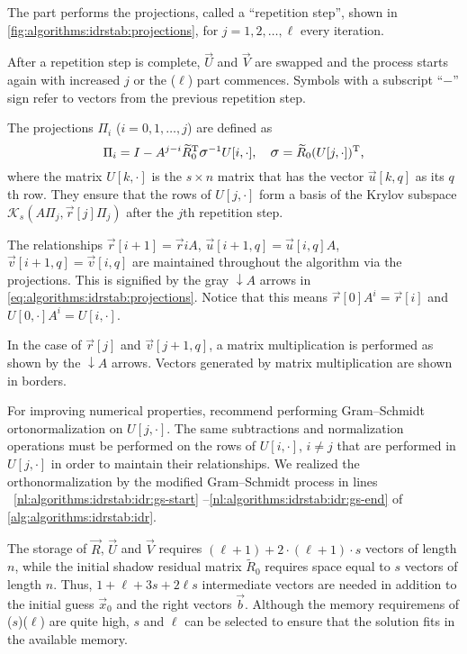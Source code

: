 The  part performs the projections, called a ``repetition
step'', shown in \cref{fig:algorithms:idrstab:projections}, for
$j = 1, 2, \ldots, \ell$ every iteration.

After a repetition step is complete, $\vec{U}$ and $\vec{V}$ are
swapped and the process starts again with increased $j$ or the
($\ell$) part commences. Symbols with a subscript
``$-$'' sign refer to vectors from the previous repetition step.

The projections $\Pi_i$ ($i = 0, 1, \ldots, j$) are defined as
\begin{equation}
  \label{eq:algorithms:idrstab:projection}
  \Pi_i = I - A^{j - i} \widetilde{R}_0^\T \largesigma^{-1} U[i, \cdot],
  \quad \largesigma = \widetilde{R}_0 (U[j, \cdot])^\T \text,
\end{equation}
where the matrix $U[k, \cdot]$ is the $s \times n$ matrix that has the
vector $\vec{u}[k, q]$ as its $q$th row. They ensure that the rows of
$U[j, \cdot]$ form a basis of the Krylov subspace
$\mathcal{K}_s(A \Pi_j, \vec{r}[j] \Pi_j)$ after the $j$th repetition
step.

The relationships $\vec{r}[i + 1] = \vec{r}{i} A$,
$\vec{u}[i + 1, q] = \vec{u}[i, q] A$,
$\vec{v}[i + 1, q] = \vec{v}[i, q]$ are maintained throughout the
algorithm via the projections. This is signified by the gray
{\color{black!50}$\downarrow A$} arrows in
\cref{eq:algorithms:idrstab:projections}. Notice that this means
$\vec{r}[0] A^i = \vec{r}[i]$ and $U[0, \cdot] A^i = U[i, \cdot]$.

In the case of $\vec{r}[j]$ and $\vec{v}[j + 1, q]$, a matrix
multiplication is performed as shown by the $\downarrow A$
arrows. Vectors generated by matrix multiplication are shown in
borders.

For improving numerical properties, \citet{sleijpen2010exploiting}
recommend performing Gram--Schmidt ortonormalization on $U[j, \cdot]$.
The same subtractions and normalization operations must be performed
on the rows of $U[i, \cdot]$, $i \ne j$ that are performed in
$U[j, \cdot]$ in order to maintain their relationships. We realized
the orthonormalization by the modified Gram--Schmidt process in lines%
~\ref{nl:algorithms:idrstab:idr:gs-start}%
--\ref{nl:algorithms:idrstab:idr:gs-end} of
\cref{alg:algorithms:idrstab:idr}.

The storage of $\vec{R}$, $\vec{U}$ and $\vec{V}$ requires
$(\ell + 1) + 2 \cdot (\ell + 1) \cdot s$ vectors of length $n$, while
the initial shadow residual matrix $\widetilde{R}_0$ requires space
equal to $s$ vectors of length $n$. Thus, $1 + \ell + 3s + 2\ell s$
intermediate vectors are needed in addition to the initial guess
$\vec{x}_0$ and the right vectors $\vec{b}$. Although the memory
requiremens of ($s$)($\ell$) are quite high,
$s$ and $\ell$ can be selected to ensure that the solution fits in the
available memory.

